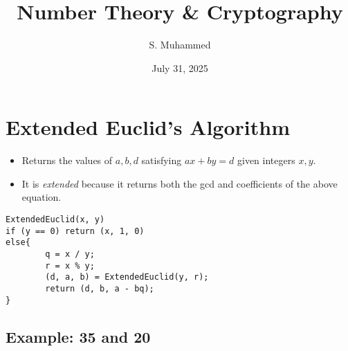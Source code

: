 \documentclass[hidelinks]{article}
\title{\textbf{\LARGE Number Theory \& Cryptography}}
\author{S. Muhammed}
\date{July 31, 2025}
\theoremstyle{mystyle}
\begin{document}
\maketitle

\section{Extended Euclid's Algorithm}

\begin{itemize}
    \item Returns the values of $a, b, d$ satisfying $ax + by = d$ given integers $x, y$.
    \item It is \emph{extended} because it returns both the gcd and coefficients of the above equation.
\end{itemize}

\begin{verbatim}
ExtendedEuclid(x, y)
if (y == 0) return (x, 1, 0)
else{
        q = x / y;
        r = x % y;
        (d, a, b) = ExtendedEuclid(y, r);
        return (d, b, a - bq);
}
\end{verbatim}


\subsection*{Example: 35 and 20}
\end{document}
